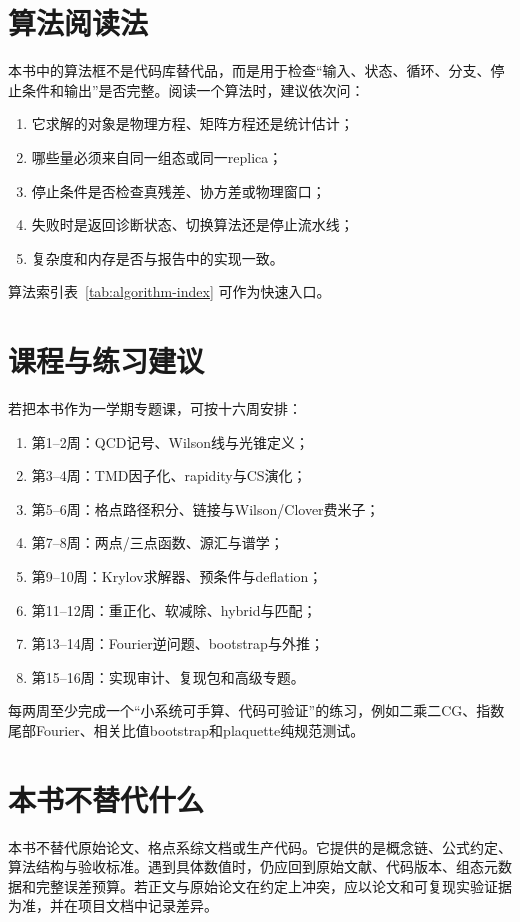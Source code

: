 \documentclass[UTF8,12pt,a4paper,twoside,openany]{ctexbook}
\begin{document}
\section*{算法阅读法}

本书中的算法框不是代码库替代品，而是用于检查“输入、状态、循环、分支、停止条件和输出”是否完整。阅读一个算法时，建议依次问：
\begin{enumerate}
  \item 它求解的对象是物理方程、矩阵方程还是统计估计；
  \item 哪些量必须来自同一组态或同一replica；
  \item 停止条件是否检查真残差、协方差或物理窗口；
  \item 失败时是返回诊断状态、切换算法还是停止流水线；
  \item 复杂度和内存是否与报告中的实现一致。
\end{enumerate}
算法索引表~\ref{tab:algorithm-index} 可作为快速入口。

\section*{课程与练习建议}

若把本书作为一学期专题课，可按十六周安排：
\begin{enumerate}
  \item 第1--2周：QCD记号、Wilson线与光锥定义；
  \item 第3--4周：TMD因子化、rapidity与CS演化；
  \item 第5--6周：格点路径积分、链接与Wilson/Clover费米子；
  \item 第7--8周：两点/三点函数、源汇与谱学；
  \item 第9--10周：Krylov求解器、预条件与deflation；
  \item 第11--12周：重正化、软减除、hybrid与匹配；
  \item 第13--14周：Fourier逆问题、bootstrap与外推；
  \item 第15--16周：实现审计、复现包和高级专题。
\end{enumerate}
每两周至少完成一个“小系统可手算、代码可验证”的练习，例如二乘二CG、指数尾部Fourier、相关比值bootstrap和plaquette纯规范测试。

\section*{本书不替代什么}

本书不替代原始论文、格点系综文档或生产代码。它提供的是概念链、公式约定、算法结构与验收标准。遇到具体数值时，仍应回到原始文献、代码版本、组态元数据和完整误差预算。若正文与原始论文在约定上冲突，应以论文和可复现实验证据为准，并在项目文档中记录差异。
\end{document}
